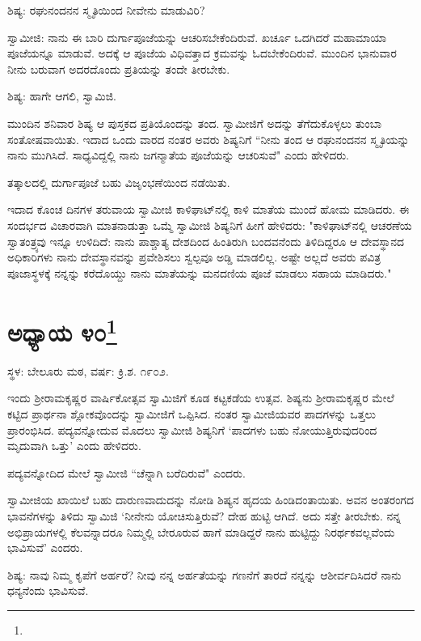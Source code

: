ಶಿಷ್ಯ: ರಘುನಂದನನ ಸ್ಮೃತಿಯಿಂದ ನೀವೇನು ಮಾಡುವಿರಿ?

ಸ್ವಾಮೀಜಿ: ನಾನು ಈ ಬಾರಿ ದುರ್ಗಾಪೂಜೆಯನ್ನು ಆಚರಿಸಬೇಕೆಂದಿರುವೆ. ಖರ್ಚೂ ಒದಗಿದರೆ ಮಹಾಮಾಯಾ ಪೂಜೆಯನ್ನೂ ಮಾಡುವೆ. ಅದಕ್ಕೆ ಆ ಪೂಜೆಯ ವಿಧಿವತ್ತಾದ ಕ್ರಮವನ್ನು ಓದಬೇಕೆಂದಿರುವೆ. ಮುಂದಿನ ಭಾನುವಾರ ನೀನು ಬರುವಾಗ ಅದರದೊಂದು ಪ್ರತಿಯನ್ನು ತಂದೇ ತೀರಬೇಕು.

ಶಿಷ್ಯ: ಹಾಗೇ ಆಗಲಿ, ಸ್ವಾಮಿಜಿ.

ಮುಂದಿನ ಶನಿವಾರ ಶಿಷ್ಯ ಆ ಪುಸ್ತಕದ ಪ್ರತಿಯೊಂದನ್ನು ತಂದ. ಸ್ವಾಮೀಜಿಗೆ ಅದನ್ನು ತೆಗೆದುಕೊಳ್ಳಲು ತುಂಬಾ ಸಂತೋಷವಾಯಿತು. ಇದಾದ ಒಂದು ವಾರದ ನಂತರ ಅವರು ಶಿಷ್ಯನಿಗೆ “ನೀನು ತಂದ ಆ ರಘುನಂದನನ ಸ್ಮೃತಿಯನ್ನು ನಾನು ಮುಗಿಸಿದೆ. ಸಾಧ್ಯವಿದ್ದಲ್ಲಿ ನಾನು ಜಗನ್ಮಾತೆಯ ಪೂಜೆಯನ್ನು ಆಚರಿಸುವೆ" ಎಂದು ಹೇಳಿದರು.

ತತ್ಕಾಲದಲ್ಲಿ ದುರ್ಗಾಪೂಜೆ ಬಹು ವಿಜೃಂಭಣೆಯಿಂದ ನಡೆಯಿತು.

\delimiter

ಇದಾದ ಕೊಂಚ ದಿನಗಳ ತರುವಾಯ ಸ್ವಾಮೀಜಿ ಕಾಳಿಘಾಟ್‌ನಲ್ಲಿ ಕಾಳಿ ಮಾತೆಯ ಮುಂದೆ ಹೋಮ ಮಾಡಿದರು. ಈ ಸಂದರ್ಭದ ವಿಚಾರವಾಗಿ ಮಾತನಾಡುತ್ತಾ ಒಮ್ಮೆ ಸ್ವಾಮೀಜಿ ಶಿಷ್ಯನಿಗೆ ಹೀಗೆ ಹೇಳಿದರು: "ಕಾಳಿಘಾಟ್‌ನಲ್ಲಿ ಆಚರಣೆಯ ಸ್ವಾತಂತ್ರ್ಯವು ಇನ್ನೂ ಉಳಿದಿದೆ: ನಾನು ಪಾಶ್ಚಾತ್ಯ ದೇಶದಿಂದ ಹಿಂತಿರುಗಿ ಬಂದವನೆಂದು ತಿಳಿದಿದ್ದರೂ ಆ ದೇವಸ್ಥಾನದ ಅಧಿಕಾರಿಗಳು ನಾನು ದೇವಸ್ಥಾನವನ್ನು ಪ್ರವೇಶಿಸಲು ಸ್ವಲ್ಪವೂ ಅಡ್ಡಿ ಮಾಡಲಿಲ್ಲ. ಅಷ್ಟೇ ಅಲ್ಲದೆ ಅವರು ಪವಿತ್ರ ಪೂಜಾಸ್ಥಳಕ್ಕೆ ನನ್ನನ್ನು ಕರೆದೊಯ್ದು ನಾನು ಮಾತೆಯನ್ನು ಮನದಣಿಯ ಪೂಜೆ ಮಾಡಲು ಸಹಾಯ ಮಾಡಿದರು."

\newpage

\chapter[ಅಧ್ಯಾಯ ೪೦]{ಅಧ್ಯಾಯ ೪೦\protect\footnote{}}

\centerline{ಸ್ಥಳ: ಬೇಲೂರು ಮಠ, ವರ್ಷ: ಕ್ರಿ.ಶ. ೧೯೦೨.}

ಇಂದು ಶ‍್ರೀರಾಮಕೃಷ್ಣರ ವಾರ್ಷಿಕೋತ್ಸವ ಸ್ವಾಮಿಜಿಗೆ ಕೂಡ ಕಟ್ಟಕಡೆಯ ಉತ್ಸವ. ಶಿಷ್ಯನು ಶ‍್ರೀರಾಮಕೃಷ್ಣರ ಮೇಲೆ ಕಟ್ಟಿದ ಪ್ರಾರ್ಥನಾ ಶ್ಲೋಕವೊಂದನ್ನು ಸ್ವಾಮೀಜಿಗೆ ಒಪ್ಪಿಸಿದ. ನಂತರ ಸ್ವಾಮೀಜಿಯವರ ಪಾದಗಳನ್ನು ಒತ್ತಲು ಪ್ರಾರಂಭಿಸಿದ. ಪದ್ಯವನ್ನೋದುವ ಮೊದಲು ಸ್ವಾಮೀಜಿ ಶಿಷ್ಯನಿಗೆ ‘ಪಾದಗಳು ಬಹು ನೋಯುತ್ತಿರುವುದರಿಂದ ಮೃದುವಾಗಿ ಒತ್ತು’ ಎಂದು ಹೇಳಿದರು.

ಪದ್ಯವನ್ನೋದಿದ ಮೇಲೆ ಸ್ವಾಮೀಜಿ “ಚೆನ್ನಾಗಿ ಬರೆದಿರುವೆ" ಎಂದರು.

ಸ್ವಾಮೀಜಿಯ ಖಾಯಿಲೆ ಬಹು ದಾರುಣವಾದುದನ್ನು ನೋಡಿ ಶಿಷ್ಯನ ಹೃದಯ ಹಿಂಡಿದಂತಾಯಿತು. ಅವನ ಅಂತರಂಗದ ಭಾವನೆಗಳನ್ನು ತಿಳಿದು ಸ್ವಾಮಿಜಿ ‘ನೀನೇನು ಯೋಚಿಸುತ್ತಿರುವೆ? ದೇಹ ಹುಟ್ಟಿ ಆಗಿದೆ. ಅದು ಸತ್ತೇ ತೀರಬೇಕು. ನನ್ನ ಅಭಿಪ್ರಾಯಗಳಲ್ಲಿ ಕೆಲವನ್ನಾದರೂ ನಿಮ್ಮಲ್ಲಿ ಬೇರೂರುವ ಹಾಗೆ ಮಾಡಿದ್ದರೆ ನಾನು ಹುಟ್ಟಿದ್ದು ನಿರರ್ಥಕವಲ್ಲವೆಂದು ಭಾವಿಸುವೆ’ ಎಂದರು.

ಶಿಷ್ಯ: ನಾವು ನಿಮ್ಮ ಕೃಪೆಗೆ ಅರ್ಹರೆ? ನೀವು ನನ್ನ ಅರ್ಹತೆಯನ್ನು ಗಣನೆಗೆ ತಾರದೆ ನನ್ನನ್ನು ಆಶೀರ್ವದಿಸಿದರೆ ನಾನು ಧನ್ಯನೆಂದು ಭಾವಿಸುವೆ.

